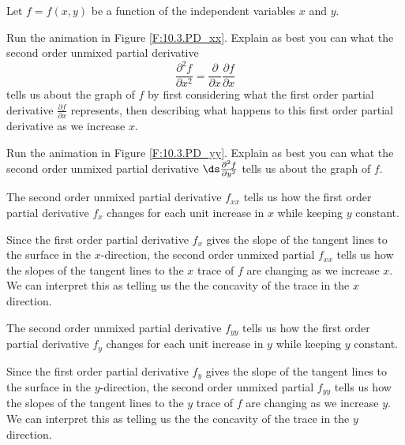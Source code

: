 \begin{activity} \label{A:10.3.2} Let $f = f(x,y)$ be a function of the independent variables $x$ and $y$.
    \ba
	\item Run the animation in Figure \ref{F:10.3.PD_xx}. Explain as best
you can what the second order unmixed partial derivative
\[\frac{\partial^2 f}{\partial x^2} = \frac{\partial}{\partial x} \frac{\partial f}{\partial x}\]
tells us about the graph of $f$ by first considering what the first order partial derivative $\frac{\partial f}{\partial x}$ represents, then
describing what happens to this first order partial derivative as we increase $x$.



    \item Run the animation in Figure \ref{F:10.3.PD_yy}. Explain as best you can what the second order unmixed partial derivative $\ds
        \frac{\partial^2 f}{\partial y^2}$ tells us about the graph of $f$.



  \ea

\end{activity}
\begin{smallhint}

\end{smallhint}
\begin{bighint}

\end{bighint}
\begin{activitySolution}
\ba
\item The second order unmixed partial derivative $f_{xx}$ tells us how the first order partial derivative $f_x$ changes for each unit increase in $x$ while keeping $y$ constant. 

Since the first order partial derivative $f_x$ gives the slope of the tangent lines to the surface in the $x$-direction, the second order unmixed partial $f_{xx}$ tells us how the slopes of the tangent lines to the $x$ trace of $f$ are changing as we increase $x$. We can interpret this as telling us the   the concavity of the trace in the $x$ direction. 

\item The second order unmixed partial derivative $f_{yy}$ tells us how the first order partial derivative $f_y$ changes for each unit increase in $y$ while keeping $y$ constant. 

Since the first order partial derivative $f_y$ gives the slope of the tangent lines to the surface in the $y$-direction, the second order unmixed partial $f_{yy}$ tells us how the slopes of the tangent lines to the $y$ trace of $f$ are changing as we increase $y$. We can interpret this as telling us the   the concavity of the trace in the $y$ direction. 
\ea
\end{activitySolution}
\aftera
